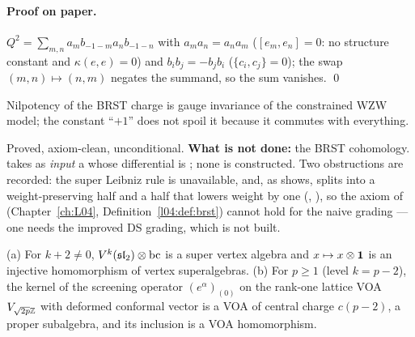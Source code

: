 \paragraph{Proof on paper.} $Q^2 = \sum_{m,n}a_mb_{-1-m}a_nb_{-1-n}$ with $a_ma_n = a_na_m$ ($[e_m,e_n] = 0$:
no structure constant and $\kappa(e,e) = 0$) and $b_ib_j = -b_jb_i$ ($\{c_i,c_j\} = 0$); the swap $(m,n)\mapsto(n,m)$
negates the summand, so the sum vanishes. \qed

\begin{physics}
Nilpotency of the BRST charge is gauge invariance of the constrained WZW model; the constant ``$+1$'' does not
spoil it because it commutes with everything.
\end{physics}

\begin{status}
Proved, axiom-clean, unconditional. \textbf{What is not done:} the BRST cohomology.  takes
as \emph{input} a  whose differential is ; none is constructed. Two obstructions are
recorded: the super Leibniz rule  is unavailable, and, as  shows,
 splits into a weight-preserving half and a half that lowers weight by one
(, ), so the  axiom of  (Chapter~\ref{ch:L04},
Definition~\ref{l04:def:brst}) cannot hold for the naive grading --- one needs the improved DS grading, which is not
built.
\end{status}

\begin{theorem}\label{l19:thm:dsmor}
(a) For $k+2\ne0$, $V^k(\mathfrak{sl}_2)\otimes\mathrm{bc}$ is a super vertex algebra and $x\mapsto x\otimes\mathbf{1}$ is an
injective homomorphism of vertex superalgebras. (b) For $p\ge1$ (level $k = p-2$), the kernel of the screening
operator $(e^{\alpha})_{(0)}$ on the rank-one lattice VOA $V_{\sqrt{2p}{\mathbb{Z}}}$ with deformed conformal vector is a VOA of
central charge $c(p-2)$, a proper subalgebra, and its inclusion is a VOA homomorphism.
\end{theorem}

